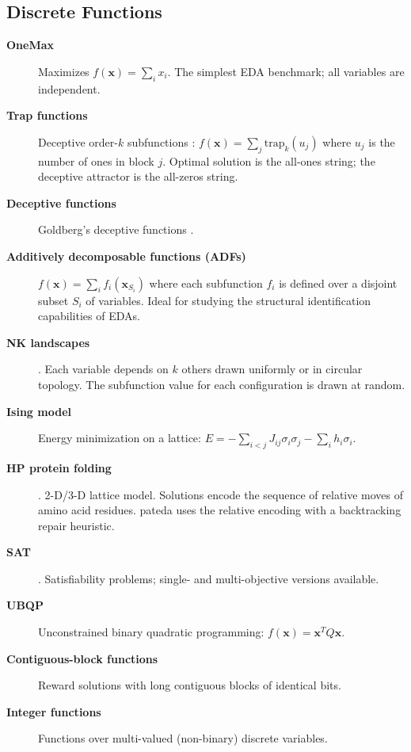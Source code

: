 \documentclass[a4paper,11pt]{article}
\begin{document}
\subsection{Discrete Functions}

\begin{description}
  \item[\textbf{OneMax}] Maximizes $f(\mathbf{x}) = \sum_i x_i$.
    The simplest EDA benchmark; all variables are independent.

  \item[\textbf{Trap functions}] Deceptive order-$k$ subfunctions
    \citep{Ackley:1987}:
    $f(\mathbf{x}) = \sum_{j} \text{trap}_k(u_j)$ where $u_j$ is the
    number of ones in block $j$.  Optimal solution is the all-ones string;
    the deceptive attractor is the all-zeros string.

  \item[\textbf{Deceptive functions}] Goldberg's deceptive functions
    \citep{Goldberg:1987}.

  \item[\textbf{Additively decomposable functions (ADFs)}]
    $f(\mathbf{x}) = \sum_i f_i(\mathbf{x}_{S_i})$ where each subfunction
    $f_i$ is defined over a disjoint subset $S_i$ of variables.  Ideal for
    studying the structural identification capabilities of EDAs.

  \item[\textbf{NK landscapes}] \citep{Kauffman:1993}.
    Each variable depends on $k$ others drawn uniformly or in circular topology.
    The subfunction value for each configuration is drawn at random.

  \item[\textbf{Ising model}]
    Energy minimization on a lattice:
    $E = -\sum_{i<j} J_{ij}\sigma_i\sigma_j - \sum_i h_i\sigma_i$.

  \item[\textbf{HP protein folding}] \citep{Dill:1985}.
    2-D/3-D lattice model.  Solutions encode the sequence of relative moves of
    amino acid residues.  pateda uses the relative encoding with a backtracking
    repair heuristic.

  \item[\textbf{SAT}] \citep{Selman_et_al:1992}.
    Satisfiability problems; single- and multi-objective versions available.

  \item[\textbf{UBQP}]
    Unconstrained binary quadratic programming:
    $f(\mathbf{x}) = \mathbf{x}^T Q \mathbf{x}$.

  \item[\textbf{Contiguous-block functions}]
    Reward solutions with long contiguous blocks of identical bits.

  \item[\textbf{Integer functions}]
    Functions over multi-valued (non-binary) discrete variables.
\end{description}
\end{document}
